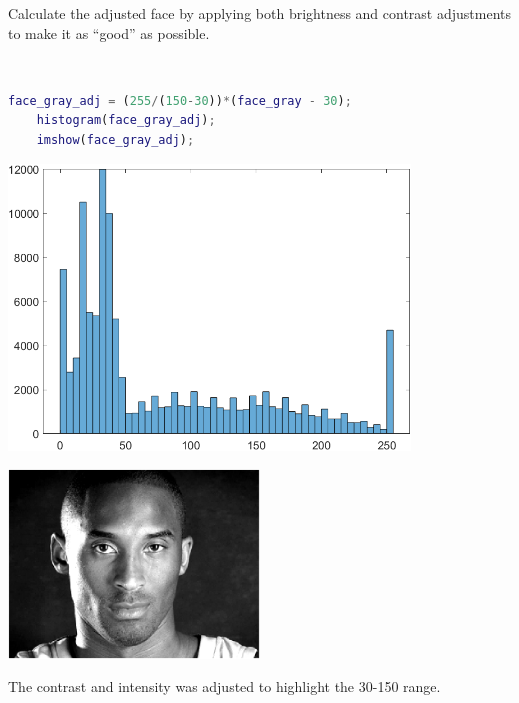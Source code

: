 Calculate the adjusted face by applying both brightness and contrast adjustments to make it as “good” as possible.

\begin{solution}\ 
    \begin{lstlisting}[language=Matlab]
    face_gray_adj = (255/(150-30))*(face_gray - 30);
    histogram(face_gray_adj);
    imshow(face_gray_adj);
    \end{lstlisting}

    \begin{center}
        \includegraphics[width=0.8\textwidth]{img/e7p8c_hist.png}
    \end{center}

    \begin{center}
        \includegraphics[width=0.5\textwidth]{img/e7p8c_img.png}
    \end{center}
    
    The contrast and intensity was adjusted to highlight the 30-150 range. 
\end{solution}